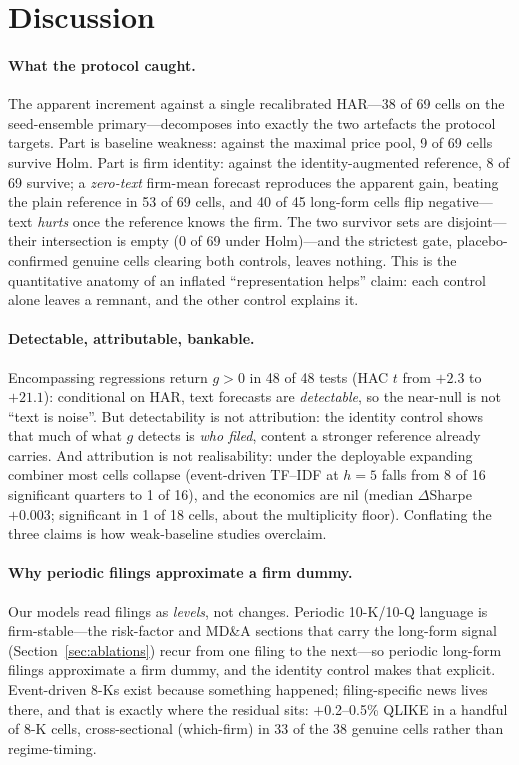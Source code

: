 \section{Discussion}
\label{sec:discussion}

\paragraph{What the protocol caught.}
The apparent increment against a single recalibrated HAR---38 of 69 cells on the seed-ensemble primary---decomposes into exactly the two artefacts the protocol targets. Part is baseline weakness: against the maximal price pool, 9 of 69 cells survive Holm. Part is firm identity: against the identity-augmented reference, 8 of 69 survive; a \emph{zero-text} firm-mean forecast reproduces the apparent gain, beating the plain reference in 53 of 69 cells, and 40 of 45 long-form cells flip negative---text \emph{hurts} once the reference knows the firm. The two survivor sets are disjoint---their intersection is empty (0 of 69 under Holm)---and the strictest gate, placebo-confirmed genuine cells clearing both controls, leaves nothing. This is the quantitative anatomy of an inflated ``representation helps'' claim: each control alone leaves a remnant, and the other control explains it.

\paragraph{Detectable, attributable, bankable.}
Encompassing regressions \citep{harvey1998encompassing} return $g>0$ in 48 of 48 tests (HAC $t$ from $+2.3$ to $+21.1$): conditional on HAR, text forecasts are \emph{detectable}, so the near-null is not ``text is noise''. But detectability is not attribution: the identity control shows that much of what $g$ detects is \emph{who filed}, content a stronger reference already carries. And attribution is not realisability: under the deployable expanding combiner most cells collapse (event-driven TF--IDF at $h{=}5$ falls from 8 of 16 significant quarters to 1 of 16), and the economics are nil (median $\Delta$Sharpe $+0.003$; significant in 1 of 18 cells, about the multiplicity floor). Conflating the three claims is how weak-baseline studies overclaim.

\paragraph{Why periodic filings approximate a firm dummy.}
Our models read filings as \emph{levels}, not changes. Periodic 10-K/10-Q language is firm-stable---the risk-factor and MD\&A sections that carry the long-form signal (Section~\ref{sec:ablations}) recur from one filing to the next---so periodic long-form filings approximate a firm dummy, and the identity control makes that explicit. Event-driven 8-Ks exist because something happened; filing-specific news lives there, and that is exactly where the residual sits: $+$0.2--0.5\% QLIKE in a handful of 8-K cells, cross-sectional (which-firm) in 33 of the 38 genuine cells rather than regime-timing.

